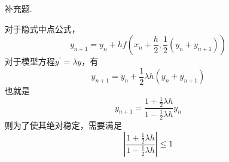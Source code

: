 \documentclass{sjtuarticle}
\begin{document}
\begin{itemize}
    \item[补充题.] \begin{solution}
        对于隐式中点公式，
        \begin{equation*}
            y_{n+1}=y_n+hf\left(x_n+\frac{h}{2},\frac{1}{2}(y_n+y_{n+1})\right)
        \end{equation*}
        对于模型方程$y^\prime=\lambda y$，有
        \begin{equation*}
            y_{n+1}=y_n+\frac{1}{2}\lambda h(y_n+y_{n+1})
        \end{equation*}
        也就是
        \begin{equation*}
            y_{n+1}=\frac{1+\frac{1}{2}\lambda h}{1-\frac{1}{2}\lambda h}y_n
        \end{equation*}
        则为了使其绝对稳定，需要满足
        \begin{equation*}
            \left|\frac{1+\frac{1}{2}\lambda h}{1-\frac{1}{2}\lambda h}\right|\leq 1
        \end{equation*}
    \end{solution}
\end{itemize}
\end{document}

